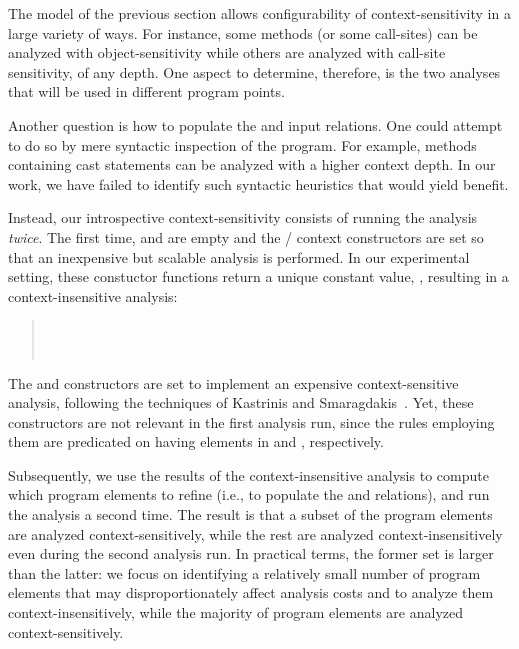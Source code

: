 The model of the previous section allows configurability of
context-sensitivity in a large variety of ways. For instance, some
methods (or some call-sites) can be analyzed with object-sensitivity
while others are analyzed with call-site sensitivity, of any
depth. One aspect to determine, therefore, is the two analyses that
will be used in different program points.

Another question is how to populate the  and
 input relations.  One could attempt to do so
by mere syntactic inspection of the program.  For example, methods
containing cast statements can be analyzed with a higher context
depth. In our work, we have failed to identify such syntactic
heuristics that would yield benefit.

Instead, our introspective context-sensitivity consists of running the
analysis \emph{twice}. The first time,  and
 are empty and the
/ context constructors are set so
that an inexpensive but scalable analysis is performed. In our
experimental setting, these constuctor functions return a unique
constant value, \args{$\star$}, resulting in a context-insensitive
analysis:
\begin{quote}
\\
 \\
\end{quote}

The  and  constructors
are set to implement an expensive context-sensitive analysis,
following the techniques of Kastrinis and
Smaragdakis~\cite{pldi:2013:Kastrinis}.  Yet, these constructors are not
relevant in the first analysis run, since the rules employing them are
predicated on having elements in  and
, respectively.

Subsequently, we use the results of the context-insensitive analysis
to compute which program elements to refine (i.e., to populate the
 and  relations), and
run the analysis a second time. The result is that a subset of the
program elements are analyzed context-sensitively, while the rest are
analyzed context-insensitively even during the second analysis run.
In practical terms, the former set is larger than the latter: we focus
on identifying a relatively small number of program elements that may
disproportionately affect analysis costs and to analyze them
context-insensitively, while the majority of program elements are
analyzed context-sensitively.

